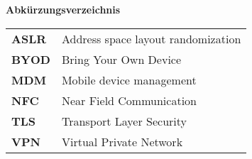 %
%
% 
% 
% 

\begin{center}
{\Large\bfseries Abkürzungsverzeichnis}
\end{center}

\begin{table*}[htbp]
		\begin{tabular}{ll}
		     \textbf{ASLR} & Address space layout randomization \\
		     \textbf{BYOD} & Bring Your Own Device\\
		     \textbf{MDM} & Mobile device management \\
		     \textbf{NFC} & Near Field Communication \\
 		     \textbf{TLS}  & Transport Layer Security \\
 		 	 \textbf{VPN} & Virtual Private Network \\
		\end{tabular}
\end{table*}